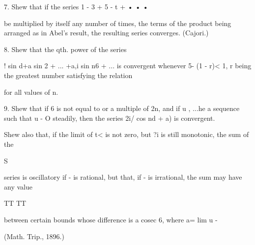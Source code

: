 7. Shew that if the series 1 - 3 + 5 - t + • • •

be multiplied by itself any number of times, the terms of the product
being arranged as in Abel's result, the resulting series converges.
(Cajori.)

8. Shew that the qth. power of the series

 ! sin d+a sin 2 + ... +a,i sin n6 + ... is convergent whenever 5- (1
- r)< 1, r being the greatest number satisfying the relation

for all values of n.

9. Shew that if 6 is not equal to or a multiple of 2n, and if %
u , ...he a sequence such that u - O steadily, then the series 2i/ cos
nd + a) is convergent.

Shew also that, if the limit of t< is not zero, but ?i is still
monotonic, the sum of the

S

series is oscillatory if - is rational, but that, if - is irrational,
the sum may have any value

TT TT

between certain bounds whose difference is a cosec 6, where a= lim u -

(Math. Trip., 1896.)

